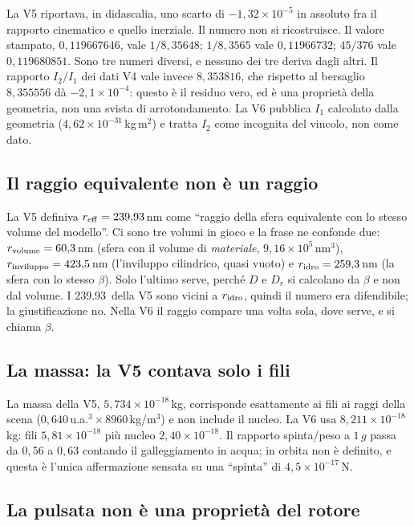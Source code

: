\documentclass[11pt,a4paper]{article}
\providecommand{\SI}[2]{#1\,\text{#2}}
\begin{document}
La V5 riportava, in didascalia, uno scarto di $-1{,}32\times10^{-5}$ in assoluto fra
il rapporto cinematico e quello inerziale. Il numero non si ricostruisce. Il valore
stampato, $0{,}119667646$, vale $1/8{,}35648$; $1/8{,}3565$ vale $0{,}11966732$;
$45/376$ vale $0{,}119680851$. Sono tre numeri diversi, e nessuno dei tre deriva
dagli altri. Il rapporto $I_2/I_1$ dei dati V4 vale invece $8{,}353816$, che rispetto
al bersaglio $8{,}355556$ d\`a $-2{,}1\times10^{-4}$: questo \`e il residuo vero, ed
\`e una propriet\`a della geometria, non una svista di arrotondamento. La V6 pubblica
$I_1$ calcolato dalla geometria ($4{,}62\times10^{-31}$\,kg\,m$^2$) e tratta
$I_2$ come incognita del vincolo, non come dato.

\subsection{Il raggio equivalente non \`e un raggio}

La V5 definiva $r_{\rm eff}=239{,}93$\,nm come ``raggio della sfera equivalente con
lo stesso volume del modello''. Ci sono tre volumi in gioco e la frase ne confonde
due: $r_{\rm volume}=60{,}3$\,nm (sfera con il volume di \emph{materiale},
$9{,}16\times10^{5}$\,nm$^3$), $r_{\rm inviluppo}=423{,}5$\,nm (l'inviluppo
cilindrico, quasi vuoto) e $r_{\rm idro}=259{,}3$\,nm (la sfera con lo stesso
$\beta$). Solo l'ultimo serve, perch\'e $D$ e $D_r$ si calcolano da $\beta$ e non dal
volume. I \SI{239.93}{nm} della V5 sono vicini a $r_{\rm idro}$, quindi il numero era
difendibile; la giustificazione no. Nella V6 il raggio compare una volta sola, dove
serve, e si chiama $\beta$.

\subsection{La massa: la V5 contava solo i fili}

La massa della V5, $5{,}734\times10^{-18}$\,kg, corrisponde esattamente ai fili ai
raggi della scena ($0{,}640$\,u.a.$^3\times8960$\,kg/m$^3$) e non include il nucleo.
La V6 usa $8{,}211\times10^{-18}$\,kg: fili $5{,}81\times10^{-18}$ pi\`u nucleo
$2{,}40\times10^{-18}$. Il rapporto spinta/peso a $1\,g$ passa da $0{,}56$ a $0{,}63$
contando il galleggiamento in acqua; in orbita non \`e definito, e questa \`e l'unica
affermazione sensata su una ``spinta'' di $4{,}5\times10^{-17}$\,N.

\subsection{La pulsata non \`e una propriet\`a del rotore}
\end{document}
